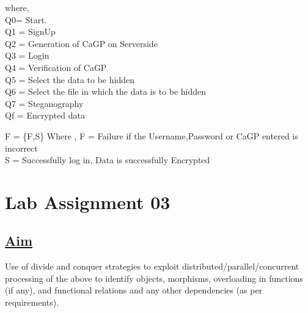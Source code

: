    where,\\ 
    \newline
    Q0= Start.\\
     \newline
    Q1 = SignUp \\
    \newline
    Q2 = Generation of CaGP on Serverside\\
    \newline
    Q3 = Login\\
    \newline 
    Q4 = Verification of CaGP\\
    \newline
    Q5 = Select the data to be hidden\\
    \newline 
    Q6 = Select the file in which the data is to be hidden\\
    \newline
    Q7 = Steganography\\
    \newline 
    Qf = Encrypted data\\
    \newline 
    
    F = \{F,S\} \newline
    \newline Where ,
    \newline F  = Failure if the Username,Password or CaGP entered is incorrect\\
        \newline S = Successfully log in, Data is successfully Encrypted\\






\newpage
\section*{\centering\LARGE{Lab Assignment 03}}
\subsection*{\underline{Aim}}
Use of divide and conquer strategies to exploit distributed/parallel/concurrent processing of the above to identify objects, morphisms, overloading in functions (if any), and functional relations and any other dependencies (as per requirements).
